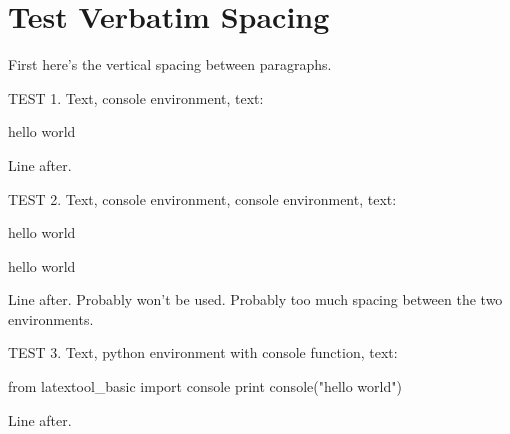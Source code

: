 \section{Test Verbatim Spacing}

First here's the vertical spacing between paragraphs.
\lipsum[2]

\lipsum[2]

TEST 1. Text, console environment, text:
\begin{console}
hello world
\end{console}
Line after.


TEST 2. Text, console environment, console environment, text:
\begin{console}
hello world
\end{console}
\begin{console}
hello world
\end{console}
Line after. 
Probably won't be used.
Probably too much spacing between the two environments.


TEST 3. Text, python environment with console function, text:
\begin{python}
from latextool_basic import console
print console("hello world")
\end{python}
Line after. 






